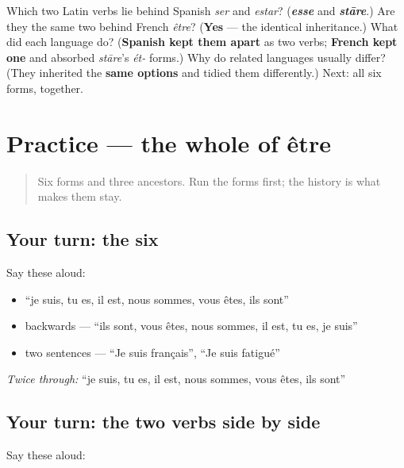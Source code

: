 \begin{tcolorbox}[breakable,colback=teal!4,colframe=teal!35!black,title={Before you move on}]
Which two Latin verbs lie behind Spanish \emph{ser} and \emph{estar}? (\emph{\textbf{esse}} and \emph{\textbf{stāre}}.) Are they the same two behind French \emph{être}? (\textbf{Yes} — the identical inheritance.) What did each language do? (\textbf{Spanish kept them apart} as two verbs; \textbf{French kept one} and absorbed \emph{stāre}'s \emph{ét-} forms.) Why do related languages usually differ? (They inherited the \textbf{same options} and tidied them differently.) Next: all six forms, together.
\end{tcolorbox}
\section[Practice]{Practice — the whole of être}

\label{lesson:FR-C16-practice}



\begin{quote}
Six forms and three ancestors. Run the forms first; the history is what makes them stay.
\end{quote}

\subsection*{Your turn: the six}
Say these aloud:

\begin{itemize}
\raggedright
  \item \textquotedblleft{}je suis, tu es, il est, nous sommes, vous êtes, ils sont\textquotedblright{}
  \item backwards — \textquotedblleft{}ils sont, vous êtes, nous sommes, il est, tu es, je suis\textquotedblright{}
  \item two sentences — \textquotedblleft{}Je suis français\textquotedblright{}, \textquotedblleft{}Je suis fatigué\textquotedblright{}
\end{itemize}

\emph{Twice through:} \textquotedblleft{}je suis, tu es, il est, nous sommes, vous êtes, ils sont\textquotedblright{}

\subsection*{Your turn: the two verbs side by side}
Say these aloud:

